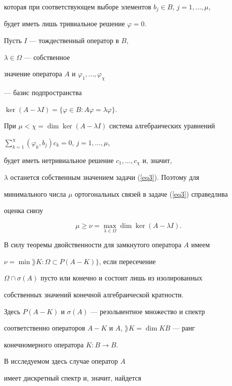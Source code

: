 которая при соответствующем выборе элементов $b_j\in B$, $j=1,\dotsc,\mu$,


будет иметь лишь тривиальное решение $\varphi=0$.





Пусть $I$ --- тождественный оператор в $B$,


$\lambda\in\Omega$ --- собственное 


значение оператора $A$ и $\varphi_1,\dotsc,\varphi_\chi$


--- базис подпространства 


$\ker(A-\lambda I)=\{\varphi\in B: A\varphi=\lambda\varphi\}$.


При $\mu < \chi = \dim\ker(A-\lambda I)$ система алгебраических уравнений


$\sum\limits_{k=1}^\chi(\varphi_k,b_j)c_k = 0$, $j = 1,\dotsc,\mu$,


будет иметь нетривиальное решение $c_1,\dotsc,c_\chi$ и, значит, 


$\lambda$ останется собственным значением задачи (\ref{eq3}). Поэтому для 


минимального числа $\mu$ ортогональных связей в задаче (\ref{eq3}) справедлива  


оценка снизу


\begin{equation}\label{eq4}


\mu\ge\nu = \max _{\lambda\in\Omega}\dim\ker(A-\lambda I).  


\end{equation}





В силу теоремы двойственности \cite{b1} для замкнутого оператора $A$ имеем


$\nu=\min\rang K :\Omega\subset P(A-K)\}$, если пересечение


$\Omega\cap\sigma(A)$ пусто или конечно и состоит лишь из изолированных 


собственных значений конечной алгебраической кратности.


Здесь $P(A-K)$ и $\sigma(A)$ --- резольвентное множество и спектр 


соответственно операторов $A-K$ и $A$, $\rang K=\dim KB$ --- ранг


конечномерного оператора $K:B\to B$.


В исследуемом здесь случае оператор $A$ 


имеет дискретный спектр и, значит, найдется


